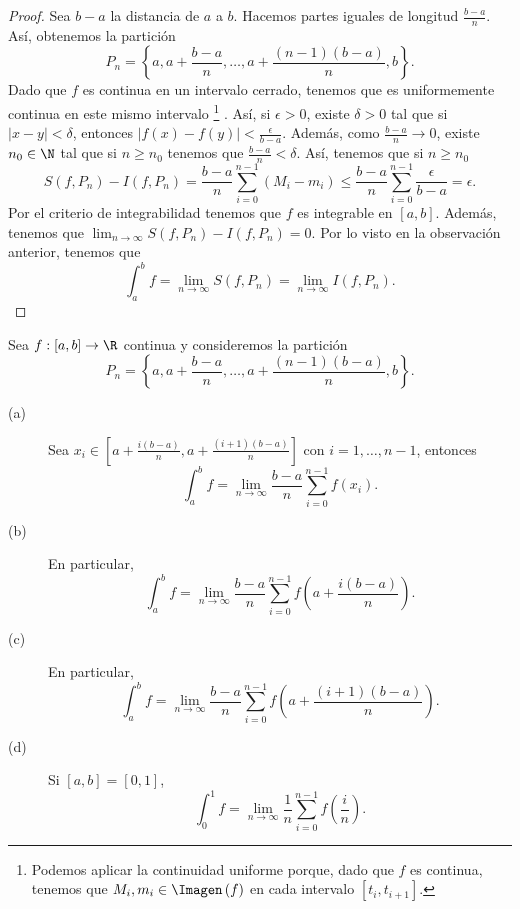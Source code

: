 \begin{proof}
Sea $\displaystyle b -a  $ la distancia de $\displaystyle a $ a $\displaystyle b $. Hacemos partes iguales de longitud $\displaystyle \frac{b-a}{n} $. Así, obtenemos la partición
\[ P_{n} = \left\{ a, a + \frac{b-a}{n}, \ldots, a + \frac{\left(n-1\right)\left(b-a\right)}{n}, b\right\}  .\]
Dado que $\displaystyle f $ es continua en un intervalo cerrado, tenemos que es uniformemente continua en este mismo intervalo \footnote{Podemos aplicar la continuidad uniforme porque, dado que $\displaystyle f $ es continua, tenemos que $\displaystyle M_{i}, m_{i} \in \Imagen\left(f\right) $ en cada intervalo $\displaystyle [t_{i}, t_{i+1}] $.} . Así, si $\displaystyle \epsilon > 0 $, existe $\displaystyle \delta > 0 $ tal que si $\displaystyle \left|x-y\right| < \delta  $, entonces $\displaystyle \left|f\left(x\right)-f\left(y\right)\right| < \frac{\epsilon }{b-a} $.
Además, como $\displaystyle \frac{b-a}{n} \to 0 $, existe $\displaystyle n_{0} \in \N $ tal que si $\displaystyle n \geq n_{0} $ tenemos que $\displaystyle \frac{b-a}{n} < \delta  $. Así, tenemos que si $\displaystyle n \geq n_{0} $ 
\[ S\left(f,P_{n}\right)-I\left(f,P_{n}\right) = \frac{b-a}{n}\sum^{n-1}_{i=0}\left(M_{i}-m_{i}\right) \leq \frac{b-a}{n}\sum^{n-1}_{i=0}\frac{\epsilon }{b-a} = \epsilon .\]
Por el criterio de integrabilidad tenemos que $\displaystyle f $ es integrable en $\displaystyle [a,b] $. Además, tenemos que $\displaystyle \lim_{n \to \infty}S\left(f,P_{n}\right)-I\left(f,P_{n}\right) = 0 $. Por lo visto en la observación anterior, tenemos que 
\[ \int^{b}_{a} f =\lim_{n \to \infty}S\left(f,P_{n}\right) = \lim_{n \to \infty}I\left(f,P_{n}\right) .\]
\end{proof}
\begin{fcolorary}[]
	\normalfont Sea $\displaystyle f : [a,b] \to \R $ continua y consideremos la partición
	\[ P_{n} = \left\{ a, a + \frac{b-a}{n}, \ldots, a + \frac{\left(n-1\right)\left(b-a\right)}{n}, b\right\}  .\]
	\begin{description}
		\item[(a)] Sea $\displaystyle x_{i} \in \left[a + \frac{i\left(b-a\right)}{n}, a + \frac{\left(i+1\right)\left(b-a\right)}{n}\right]  $ con $\displaystyle i = 1, \ldots, n-1 $, entonces
			\[\int^{b}_{a} f = \lim_{n \to \infty}\frac{b-a}{n}\sum^{n-1}_{i = 0}f\left(x_{i}\right) .\]
		\item[(b)] En particular, 
			\[\int^{b}_{a} f = \lim_{n \to \infty}\frac{b-a}{n}\sum^{n-1}_{i = 0}f\left(a + \frac{i\left(b-a\right)}{n}\right) .\]
		\item[(c)] En particular,
			\[\int^{b}_{a} f = \lim_{n \to \infty}\frac{b-a}{n}\sum^{n-1}_{i = 0}f\left(a + \frac{\left(i+1\right)\left(b-a\right)}{n}\right) .\]
		\item[(d)] Si $\displaystyle [a,b] = [0,1]$, 
			\[\int^{1}_{0} f = \lim_{n \to \infty}\frac{1}{n}\sum^{n-1}_{ i= 0}f\left(\frac{i}{n}\right) .\]
	\end{description}
\end{fcolorary}
